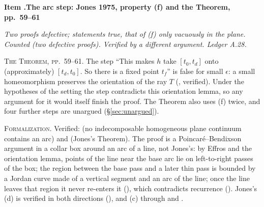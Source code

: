 \documentclass[11pt]{article}
\newcounter{defect}
\newenvironment{defect}[4]{%
  \par\addvspace{10pt}\refstepcounter{defect}%
  \noindent\textbf{Item \thedefect.\enspace #1}\par\nopagebreak
  \noindent\textit{#2}\par\nopagebreak\smallskip}{\par\addvspace{6pt}}
\newcommand{\fld}[1]{\par\noindent\textsc{#1.}\enspace}
\begin{document}
\begin{defect}{The arc step: Jones 1975, property (f) and the Theorem, pp.~59--61}{Two proofs
defective; statements true, that of (f) only vacuously in the plane. Counted (two defective
proofs). Verified by a different argument.
Ledger A.28.}{0}{2}
\fld{The Theorem, pp.~59--61} The step ``This makes $h$ take $[t_0,t_d]$ onto (approximately)
$[t_d,t_0]$. So there is a fixed point $t_f$'' is false for small $\epsilon$: a small
homeomorphism preserves the orientation of the ray $T$ (, verified).
Under the hypotheses of the setting the step contradicts this orientation lemma, so any argument for
it would itself finish the proof. The Theorem also uses (f) twice, and four further steps are
unargued (\S\ref{sec:unargued}).

\fld{Formalization} Verified:  (no indecomposable homogeneous plane continuum
contains an arc) and  (Jones's Theorem). The proof is a
Poincaré--Bendixson argument in a collar box around an arc of a line, not Jones's: by Effros and
the orientation lemma, points of the line near the base arc lie on left-to-right passes of the box;
the region between the base pass and a later thin pass is bounded by a Jordan curve made of a
vertical segment and an arc of the line; once the line leaves that region it never re-enters it
(), which contradicts recurrence (). Jones's (d) is
verified in both directions (), and (c) through
 and .
\end{defect}
\end{document}
